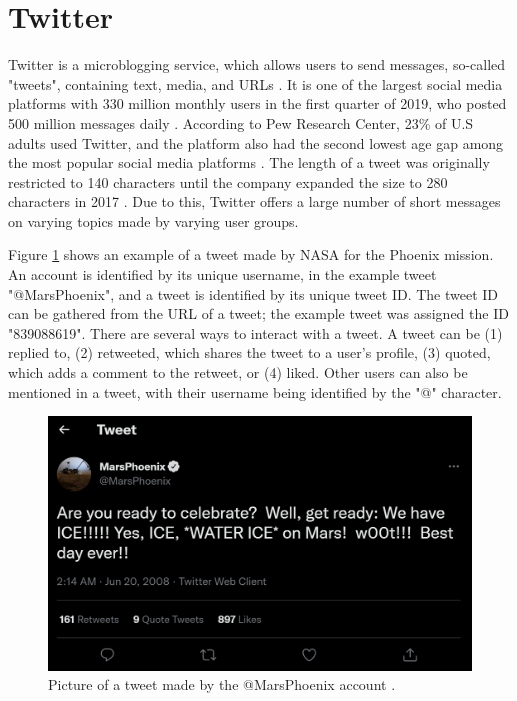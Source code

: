 \section{Twitter}
Twitter is a microblogging service, which allows users to send messages, so-called "tweets", containing text, media, and URLs \cite{DBLP:journals/csur/GiachanouC16}. It is one of the largest social media platforms with 330 million monthly users in the first quarter of 2019, who posted 500 million messages daily \cite{twitter:users}. According to Pew Research Center, 23\% of U.S adults used Twitter, and the platform also had the second lowest age gap among the most popular social media platforms \cite{pew:socialmedia}. The length of a tweet was originally restricted to 140 characters until the company expanded the size to 280 characters in 2017 \cite{twitter:characters}. Due to this, Twitter offers a large number of short messages on varying topics made by varying user groups. 

Figure \ref{fig:example_tweet} shows an example of a tweet made by NASA for the Phoenix mission. An account is identified by its unique username, in the example tweet "@MarsPhoenix", and a tweet is identified by its unique tweet ID. The tweet ID can be gathered from the URL of a tweet; the example tweet was assigned the ID "839088619". There are several ways to interact with a tweet. A tweet can be (1) replied to, (2) retweeted, which shares the tweet to a user's profile, (3) quoted, which adds a comment to the retweet, or (4) liked. Other users can also be mentioned in a tweet, with their username being identified by the "@" character. 

\begin{figure}
    \centering
    \includegraphics[scale=0.3]{Images/twitter_image.png}
    \caption{Picture of a tweet made by the @MarsPhoenix account \cite{twitter:tweet}.}
    \label{fig:example_tweet}
\end{figure}

